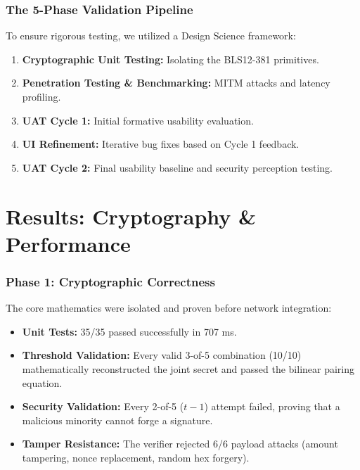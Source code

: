 \documentclass{beamer}
\begin{document}
\begin{frame}
  \frametitle{The 5-Phase Validation Pipeline}
  To ensure rigorous testing, we utilized a Design Science framework:
  \vspace{0.2cm}
  \begin{enumerate}
      \item \textbf{Cryptographic Unit Testing:} Isolating the BLS12-381 primitives.
      \item \textbf{Penetration Testing \& Benchmarking:} MITM attacks and latency profiling.
      \item \textbf{UAT Cycle 1:} Initial formative usability evaluation.
      \item \textbf{UI Refinement:} Iterative bug fixes based on Cycle 1 feedback.
      \item \textbf{UAT Cycle 2:} Final usability baseline and security perception testing.
  \end{enumerate}
\end{frame}

\section{Results: Cryptography \& Performance}
\begin{frame}
  \frametitle{Phase 1: Cryptographic Correctness}
  The core mathematics were isolated and proven before network integration:
  \vspace{0.3cm}
  \begin{itemize}
      \item \textbf{Unit Tests:} 35/35 passed successfully in 707 ms.
      \item \textbf{Threshold Validation:} Every valid 3-of-5 combination (10/10) mathematically reconstructed the joint secret and passed the bilinear pairing equation.
      \item \textbf{Security Validation:} Every 2-of-5 ($t-1$) attempt failed, proving that a malicious minority cannot forge a signature.
      \item \textbf{Tamper Resistance:} The verifier rejected 6/6 payload attacks (amount tampering, nonce replacement, random hex forgery).
  \end{itemize}
\end{frame}
\end{document}
